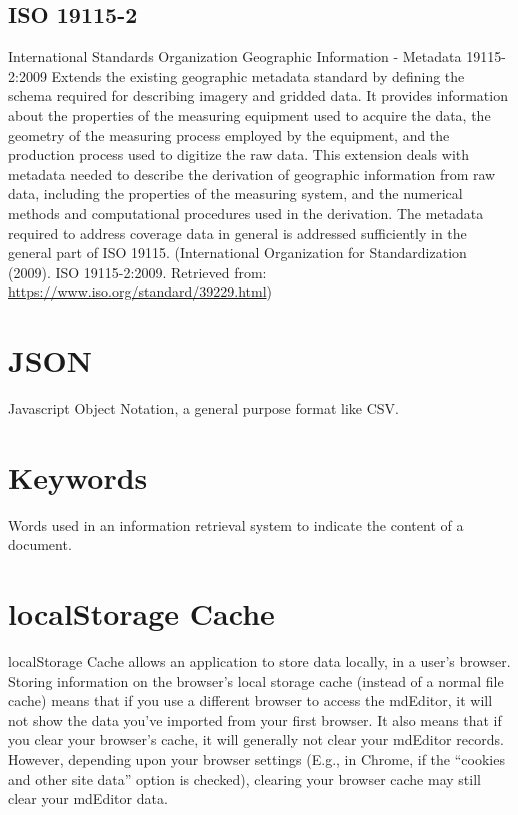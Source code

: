 \documentclass[
]{book}
\begin{document}
\hypertarget{iso-19115-2}{%
\subsection{ISO 19115-2}\label{iso-19115-2}}

International Standards Organization Geographic Information - Metadata 19115-2:2009
Extends the existing geographic metadata standard by defining the schema required for describing imagery and gridded data. It provides information about the properties of the measuring equipment used to acquire the data, the geometry of the measuring process employed by the equipment, and the production process used to digitize the raw data. This extension deals with metadata needed to describe the derivation of geographic information from raw data, including the properties of the measuring system, and the numerical methods and computational procedures used in the derivation. The metadata required to address coverage data in general is addressed sufficiently in the general part of ISO 19115. (International Organization for Standardization (2009). ISO 19115-2:2009. Retrieved from: \url{https://www.iso.org/standard/39229.html})

\hypertarget{json}{%
\section{JSON}\label{json}}

Javascript Object Notation, a general purpose format like CSV.

\hypertarget{keywords}{%
\section{Keywords}\label{keywords}}

Words used in an information retrieval system to indicate the content of a document.

\hypertarget{localstorage-cache}{%
\section{localStorage Cache}\label{localstorage-cache}}

localStorage Cache allows an application to store data locally, in a user's browser. Storing information on the browser's local storage cache (instead of a normal file cache) means that if you use a different browser to access the mdEditor, it will not show the data you've imported from your first browser. It also means that if you clear your browser's cache, it will generally not clear your mdEditor records. However, depending upon your browser settings (E.g., in Chrome, if the ``cookies and other site data'' option is checked), clearing your browser cache may still clear your mdEditor data.
\end{document}
